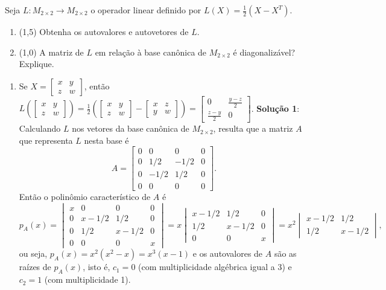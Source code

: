 \documentclass[12pt,a4paper]{article}
\begin{document}
\begin{ExerciseList}
\Exercise[title={2,5}] Seja $L: M_{2\times 2} \to M_{2\times 2}$ o operador linear definido por $L(X) = \frac{1}{2}(X - X^T)$.
\begin{enumerate}
\item (1,5) Obtenha os autovalores e autovetores de $L$.
\item (1,0) A matriz de $L$ em relação à base canônica de $M_{2\times 2}$ é diagonalizável? Explique.
\end{enumerate}
\Answer
\begin{enumerate}
\item Se $X =
\begin{bmatrix}
x & y \\
z & w
\end{bmatrix}$, então
$
L\left(
\begin{bmatrix}
x & y \\
z & w
\end{bmatrix}
\right)
= \frac{1}{2}\left(
\begin{bmatrix}
x & y \\
z & w
\end{bmatrix} -
\begin{bmatrix}
x & z \\
y & w
\end{bmatrix}\right)
=
\begin{bmatrix}
0 &
\frac{y-z}{2} \\
\frac{z-y}{2} & 0
\end{bmatrix}$.
\textbf{Solução 1}: Calculando $L$ nos vetores da base canônica de $M_{2\times 2}$, resulta que a matriz $A$ que representa $L$ nesta base é
\[
A = \begin{bmatrix}
0 & 0 & 0 & 0 \\
0 & 1/2 & -1/2 & 0 \\
0 & -1/2 & 1/2 & 0 \\
0 & 0 & 0 & 0
\end{bmatrix}.
\]
Então o polinômio característico de $A$ é
\[
p_A(x)
=
\begin{vmatrix}
x & 0 & 0 & 0 \\
0 & x-1/2 & 1/2 & 0 \\
0 & 1/2 & x-1/2 & 0 \\
0 & 0 & 0 & x
\end{vmatrix}
=
x
\begin{vmatrix}
x-1/2 & 1/2 & 0 \\
1/2 & x-1/2 & 0 \\
0 & 0 & x
\end{vmatrix}
=
x^2
\begin{vmatrix}
x-1/2 & 1/2 \\
1/2 & x-1/2
\end{vmatrix},
\]
ou seja, $p_A(x) = x^2( x^2 - x) = x^3(x-1)$ e os autovalores de $A$ são as raízes de $p_A(x)$, isto é, $c_1 = 0$ (com multiplicidade algébrica igual a 3) e $c_2 = 1$ (com multiplicidade 1).


\end{enumerate}
\end{ExerciseList}
\end{document}
